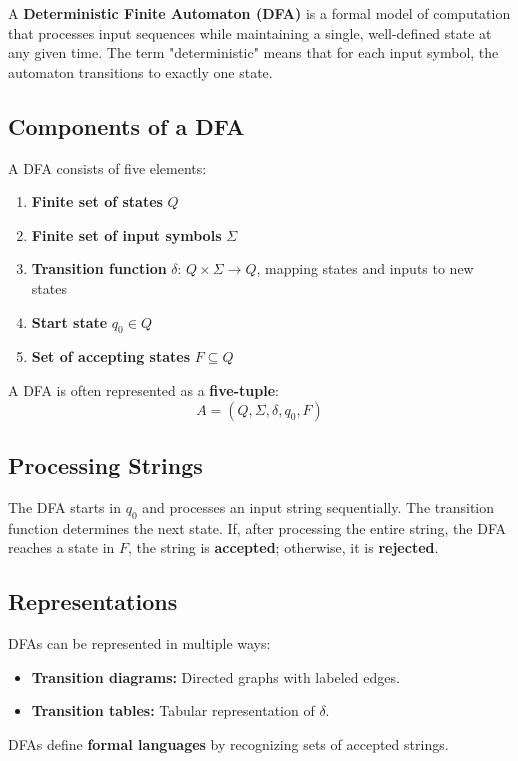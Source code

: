 \documentclass{article}
\begin{document}
A \textbf{Deterministic Finite Automaton (DFA)} is a formal model of computation that processes input sequences while maintaining a single, well-defined state at any given time. The term "deterministic" means that for each input symbol, the automaton transitions to exactly one state.

\subsection*{Components of a DFA}
A DFA consists of five elements:
\begin{enumerate}
    \item \textbf{Finite set of states} \( Q \)
    \item \textbf{Finite set of input symbols} \( \Sigma \)
    \item \textbf{Transition function} \( \delta \): \( Q \times \Sigma \to Q \), mapping states and inputs to new states
    \item \textbf{Start state} \( q_0 \in Q \)
    \item \textbf{Set of accepting states} \( F \subseteq Q \)
\end{enumerate}

A DFA is often represented as a \textbf{five-tuple}:
\[
A = (Q, \Sigma, \delta, q_0, F)
\]

\subsection*{Processing Strings}
The DFA starts in \( q_0 \) and processes an input string sequentially. The transition function determines the next state. If, after processing the entire string, the DFA reaches a state in \( F \), the string is \textbf{accepted}; otherwise, it is \textbf{rejected}.

\subsection*{Representations}
DFAs can be represented in multiple ways:
\begin{itemize}
    \item \textbf{Transition diagrams:} Directed graphs with labeled edges.
    \item \textbf{Transition tables:} Tabular representation of \( \delta \).
\end{itemize}

DFAs define \textbf{formal languages} by recognizing sets of accepted strings.
\end{document}
